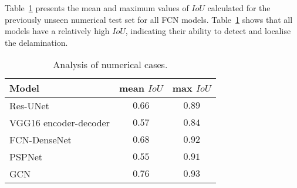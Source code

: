 Table~\ref{tab:table_all_numerical_cases} presents the mean and maximum values of \(IoU\) calculated for the previously unseen numerical test set for all FCN models.
Table~\ref{tab:table_all_numerical_cases} shows that all models have a relatively high \(IoU\), indicating their ability to detect and localise the delamination.
\begin{table}[ht!]
	\centering
	\caption{Analysis of numerical cases.}
	\label{tab:table_all_numerical_cases}	
	\begin{tabular}{lcc}
		\toprule
		Model & mean \(IoU\) & max \(IoU\) \\ 
		\midrule 
		Res-UNet & \(0.66\) & \(0.89\) \\ 
		VGG16 encoder-decoder & \(0.57\) & \(0.84\) \\ 
		FCN-DenseNet & \(0.68\) & \(0.92\) \\ 
		PSPNet & \(0.55\) & \(0.91\) \\ 
		GCN & \(0.76\) & \(0.93\) \\ 
		\bottomrule
	\end{tabular}
	
\end{table}
\clearpage
